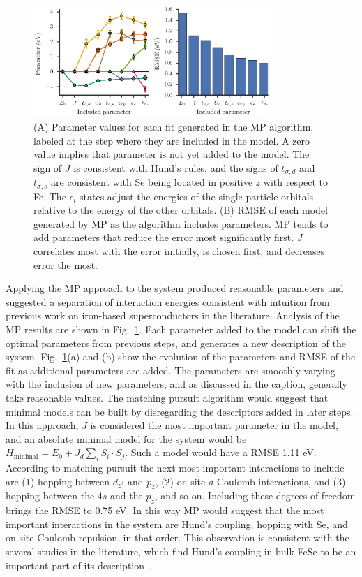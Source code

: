 \begin{figure}
  \centering
  \includegraphics[width=0.8\textwidth]{./Figures/fese.eps}
  \caption{
    \label{fig:fese} 
    (A) Parameter values for each fit generated in the MP algorithm, labeled at the step where they are included in the model. 
    A zero value implies that parameter is not yet added to the model.
    The sign of $J$ is consistent with Hund's rules, and the signs of $t_{\sigma,d}$ and $t_{\sigma,s}$ are consistent with Se being located in positive $z$ with respect to Fe. 
    The $\epsilon_i$ states adjust the energies of the single particle orbitals relative to the energy of the other orbitals.
    (B) RMSE of each model generated by MP as the algorithm includes parameters. 
    MP tends to add parameters that reduce the error most significantly first. 
    $J$ correlates most with the error initially, is chosen first, and decreases error the most.
  }
\end{figure}

Applying the MP approach to the system produced reasonable parameters and suggested a separation of interaction energies consistent with intuition from previous work on iron-based superconductors in the literature.
Analysis of the MP results are shown in Fig.~\ref{fig:fese}. 
Each parameter added to the model can shift the optimal parameters from previous steps, and generates a new description of the system. 
Fig.~\ref{fig:fese}(a) and (b) show the evolution of the parameters and RMSE of the fit as additional parameters are added.
The parameters are smoothly varying with the inclusion of new parameters, and as discussed in the caption, generally take reasonable values.
The matching pursuit algorithm would suggest that minimal models can be built by disregarding the descriptors added in later steps.
In this approach, $J$ is considered the most important parameter in the model, and an absolute minimal model for the system would be $H_\text{minimal} = E_0 + J_d \sum_i S_i \cdot S_j$. 
Such a model would have a RMSE 1.11 eV. 
According to matching pursuit the next most important interactions to include are (1) hopping between $d_{z^2}$ and $p_z$, (2) on-site $d$ Coulomb interactions, and (3) hopping between the $4s$ and the $p_z$, and so on. 
Including these degrees of freedom brings the RMSE to 0.75 eV.
In this way MP would suggest that the most important interactions in the system are Hund's coupling, hopping with Se, and on-site Coulomb repulsion, in that order.
This observation is consistent with the several studies in the literature, which find Hund's coupling in bulk FeSe to be an important part of its description~\cite{demedici_hunds_2011,de_medici_janus-faced_2011,georges_strong_2013,busemeyer_competing_2016}.
